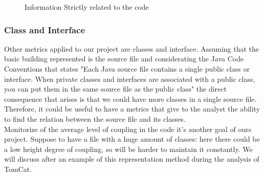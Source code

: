 \documentclass[]{usiinfbachelorproject}
\begin{document}
\begin{figure}[h]
\centering
{}
\hspace*{\fill}

\caption{Information Strictly related to the code}
\label{fig:strictly}
\end{figure}
\newpage

\subsubsection{Class and Interface}

Other metrics applied to our project are classes and interface.  Assuming that the basic building represented is the source file and considerating the Java Code Conventions that states \cite{oracle} "Each Java source file contains a single public class or interface. When private classes and interfaces are associated with a public class, you can put them in the same source file as the public class" the direct consequence that arises is that we could have more classes in a single source file. Therefore, it could be useful to have a metrics that give to the analyst the ability to find the relation between the source file and its classes. \\
Monitorize of the average level of coupling in the code it's another goal of ours project. Suppose to have a file with a huge amount of classes: here there could be a low height degree of coupling, so will be harder to maintain it constantly. We will discuss after an example of this representation method during the analysis of TomCat.
\end{document}
